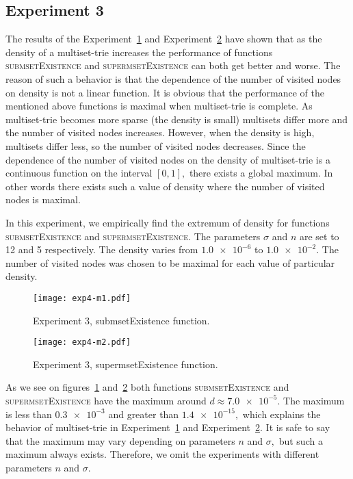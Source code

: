 \subsection{Experiment 3} \label{s:exp3}
The results of the Experiment~\hyperref[s:exp1]{1} and Experiment~\hyperref[s:exp2]{2} 
have shown that as the density of a multiset-trie increases the performance of 
functions \textsc{submsetExistence} and \textsc{supermsetExistence} can both get 
better and worse. The reason of such a behavior is that the dependence of the 
number of visited nodes on density is not a linear function. It is obvious that the 
performance of the mentioned above functions is maximal when multiset-trie is 
complete. As multiset-trie becomes more sparse (the density is small) multisets 
differ more and the number of visited nodes increases. However, when the density 
is high, multisets differ less, so the number of visited nodes decreases. Since 
the dependence of the number of visited nodes on the density of multiset-trie 
is a continuous function on the interval $[0,1],$ there exists a global maximum. 
In other words there exists such a value of density where the number of visited 
nodes is maximal. 

In this experiment, we empirically find the extremum of density for functions 
\textsc{submsetExistence} and \textsc{supermsetExistence}. The parameters 
$\sigma$ and $n$ are set to 12 and 5 respectively. The density varies from 
$\num{1.0e-6}$ to $\num{1.0e-2}.$ The number of visited nodes was chosen to be 
maximal for each value of particular density.

\begin{figure}
\center
\texttt{[image: exp4-m1.pdf]}
\caption{Experiment 3, submsetExistence function.}
\label{fig:e3m1}
\end{figure}

\begin{figure}
\center
\texttt{[image: exp4-m2.pdf]}
\caption{Experiment 3, supermsetExistence function.}
\label{fig:e3m2}
\end{figure}

As we see on figures~\ref{fig:e3m1} and~\ref{fig:e3m2} both functions 
\textsc{submsetExistence} and \textsc{supermsetExistence} have the maximum 
around $d\approx \num{7.0e-5}.$ The maximum is less than $\num{0.3e-3}$ and 
greater than $\num{1.4e-15},$ which explains the behavior of multiset-trie in 
Experiment~\hyperref[s:exp1]{1} and Experiment~\hyperref[s:exp2]{2}. It is safe 
to say that the maximum may vary depending on parameters $n$ and $\sigma,$ but 
such a maximum always exists. Therefore, we omit the experiments with different 
parameters $n$ and $\sigma.$


